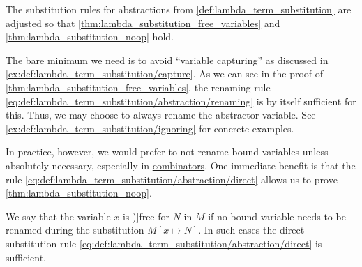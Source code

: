 \begin{remark}\label{rem:renaming_substitution_rules}
  The substitution rules for abstractions from \cref{def:lambda_term_substitution} are adjusted so that \cref{thm:lambda_substitution_free_variables} and \cref{thm:lambda_substitution_noop} hold.

  The bare minimum we need is to avoid \enquote{variable capturing} as discussed in \cref{ex:def:lambda_term_substitution/capture}. As we can see in the proof of \cref{thm:lambda_substitution_free_variables}, the renaming rule \eqref{eq:def:lambda_term_substitution/abstraction/renaming} is by itself sufficient for this. Thus, we may choose to always rename the abstractor variable. See \cref{ex:def:lambda_term_substitution/ignoring} for concrete examples.

  In practice, however, we would prefer to not rename bound variables unless absolutely necessary, especially in \hyperref[def:lambda_combinator]{combinators}. One immediate benefit is that the rule \eqref{eq:def:lambda_term_substitution/abstraction/direct} allows us to prove \cref{thm:lambda_substitution_noop}.

  We say that the variable \( x \) is \term[en=free for (\cite[213]{Andrews2002Logic})]{free for} \( N \) in \( M \) if no bound variable needs to be renamed during the substitution \( M[x \mapsto N] \). In such cases the direct substitution rule \eqref{eq:def:lambda_term_substitution/abstraction/direct} is sufficient.
\end{remark}

